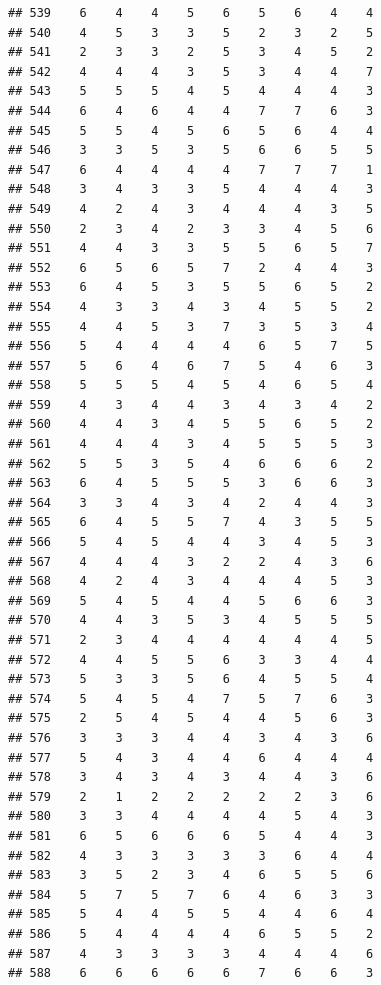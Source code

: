 \documentclass[
]{article}
\begin{document}
\begin{verbatim}
## 539    6    4    4    5    6    5    6    4    4
## 540    4    5    3    3    5    2    3    2    5
## 541    2    3    3    2    5    3    4    5    2
## 542    4    4    4    3    5    3    4    4    7
## 543    5    5    5    4    5    4    4    4    3
## 544    6    4    6    4    4    7    7    6    3
## 545    5    5    4    5    6    5    6    4    4
## 546    3    3    5    3    5    6    6    5    5
## 547    6    4    4    4    4    7    7    7    1
## 548    3    4    3    3    5    4    4    4    3
## 549    4    2    4    3    4    4    4    3    5
## 550    2    3    4    2    3    3    4    5    6
## 551    4    4    3    3    5    5    6    5    7
## 552    6    5    6    5    7    2    4    4    3
## 553    6    4    5    3    5    5    6    5    2
## 554    4    3    3    4    3    4    5    5    2
## 555    4    4    5    3    7    3    5    3    4
## 556    5    4    4    4    4    6    5    7    5
## 557    5    6    4    6    7    5    4    6    3
## 558    5    5    5    4    5    4    6    5    4
## 559    4    3    4    4    3    4    3    4    2
## 560    4    4    3    4    5    5    6    5    2
## 561    4    4    4    3    4    5    5    5    3
## 562    5    5    3    5    4    6    6    6    2
## 563    6    4    5    5    5    3    6    6    3
## 564    3    3    4    3    4    2    4    4    3
## 565    6    4    5    5    7    4    3    5    5
## 566    5    4    5    4    4    3    4    5    3
## 567    4    4    4    3    2    2    4    3    6
## 568    4    2    4    3    4    4    4    5    3
## 569    5    4    5    4    4    5    6    6    3
## 570    4    4    3    5    3    4    5    5    5
## 571    2    3    4    4    4    4    4    4    5
## 572    4    4    5    5    6    3    3    4    4
## 573    5    3    3    5    6    4    5    5    4
## 574    5    4    5    4    7    5    7    6    3
## 575    2    5    4    5    4    4    5    6    3
## 576    3    3    3    4    4    3    4    3    6
## 577    5    4    3    4    4    6    4    4    4
## 578    3    4    3    4    3    4    4    3    6
## 579    2    1    2    2    2    2    2    3    6
## 580    3    3    4    4    4    4    5    4    3
## 581    6    5    6    6    6    5    4    4    3
## 582    4    3    3    3    3    3    6    4    4
## 583    3    5    2    3    4    6    5    5    6
## 584    5    7    5    7    6    4    6    3    3
## 585    5    4    4    5    5    4    4    6    4
## 586    5    4    4    4    4    6    5    5    2
## 587    4    3    3    3    3    4    4    4    6
## 588    6    6    6    6    6    7    6    6    3

\end{verbatim}
\end{document}
